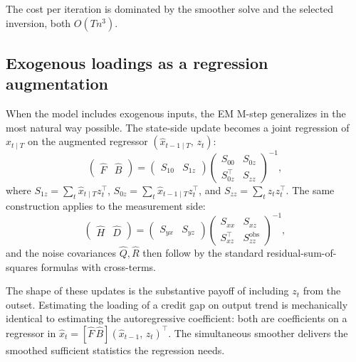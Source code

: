 \documentclass[11pt]{article}
\begin{document}
The cost per iteration is dominated by the smoother solve and the
selected inversion, both $O(Tn^3)$.

\subsection{Exogenous loadings as a regression augmentation}

When the model includes exogenous inputs, the EM M-step generalizes
in the most natural way possible.  The state-side update becomes a
joint regression of $\widehat x_{t\mid T}$ on the augmented regressor
$(\widehat x_{t-1\mid T},\,z_t)$:
\begin{equation}
\begin{pmatrix}\widehat F & \widehat B\end{pmatrix}
=\begin{pmatrix}S_{10} & S_{1z}\end{pmatrix}
\begin{pmatrix}S_{00} & S_{0z}\\ S_{0z}^\top & S_{zz}\end{pmatrix}^{-1},
\label{eq:em-FB}
\end{equation}
where $S_{1z}=\sum_t \widehat x_{t\mid T}z_t^\top$,
$S_{0z}=\sum_t \widehat x_{t-1\mid T}z_t^\top$, and
$S_{zz}=\sum_t z_t z_t^\top$.  The same construction applies to the
measurement side:
\begin{equation}
\begin{pmatrix}\widehat H & \widehat D\end{pmatrix}
=\begin{pmatrix}S_{yx} & S_{yz}\end{pmatrix}
\begin{pmatrix}S_{xx} & S_{xz}\\ S_{xz}^\top & S_{zz}^{\text{obs}}\end{pmatrix}^{-1},
\end{equation}
and the noise covariances $\widehat Q,\widehat R$ then follow by
the standard residual-sum-of-squares formulas with cross-terms.

The shape of these updates is the substantive payoff of including
$z_t$ from the outset.  Estimating the loading of a credit gap on
output trend is mechanically identical to estimating the autoregressive
coefficient: both are coefficients on a regressor in
$\widehat x_t = [\widehat F\,\widehat B](\widehat x_{t-1},\,z_t)^\top$.
The simultaneous smoother delivers the smoothed sufficient statistics
the regression needs.
\end{document}
